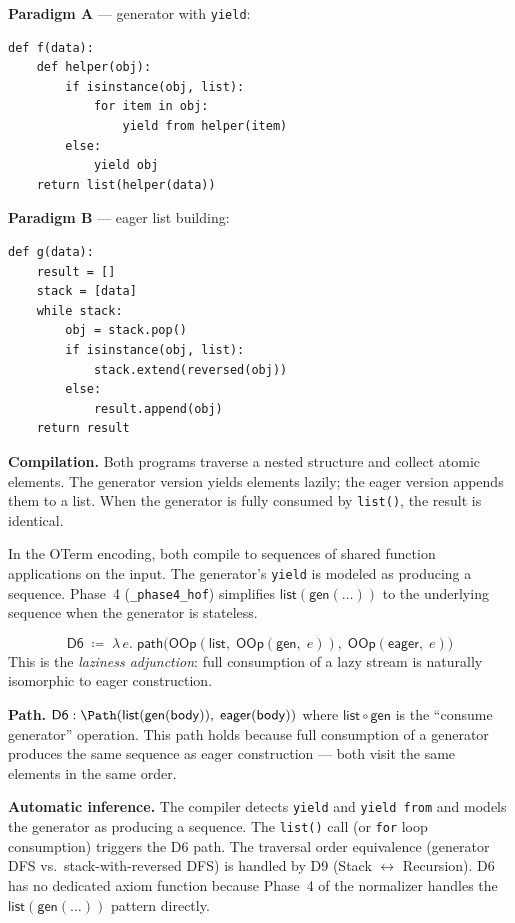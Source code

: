\textbf{Paradigm A} --- generator with \texttt{yield}:
\begin{lstlisting}
def f(data):
    def helper(obj):
        if isinstance(obj, list):
            for item in obj:
                yield from helper(item)
        else:
            yield obj
    return list(helper(data))
\end{lstlisting}

\textbf{Paradigm B} --- eager list building:
\begin{lstlisting}
def g(data):
    result = []
    stack = [data]
    while stack:
        obj = stack.pop()
        if isinstance(obj, list):
            stack.extend(reversed(obj))
        else:
            result.append(obj)
    return result
\end{lstlisting}

\textbf{Compilation.}
Both programs traverse a nested structure and collect atomic elements.
The generator version yields elements lazily; the eager version
appends them to a list.  When the generator is fully consumed by
\texttt{list()}, the result is identical.

In the OTerm encoding, both compile to sequences of shared function
applications on the input.  The generator's \texttt{yield} is modeled
as producing a sequence.  Phase~4 (\texttt{\_phase4\_hof}) simplifies
$\mathsf{list}(\mathsf{gen}(\ldots))$ to the underlying sequence when
the generator is stateless.

\begin{definition}
\label{def:d6-path}
\[
  \mathsf{D6} \;\coloneqq\; \lambda\, e.\;
  \mathsf{path}\!\big(
    \mathsf{OOp}(\mathsf{list},\;
      \mathsf{OOp}(\mathsf{gen},\; e)),\;
    \mathsf{OOp}(\mathsf{eager},\; e)
  \big)
\]
This is the \emph{laziness adjunction}: full consumption of a lazy
stream is naturally isomorphic to eager construction.
\end{definition}

\textbf{Path.}
$\mathsf{D6} : \Path(\mathsf{list}(\mathsf{gen}(\mathsf{body})),\;
\mathsf{eager}(\mathsf{body}))$
where $\mathsf{list} \circ \mathsf{gen}$ is the ``consume generator''
operation.  This path holds because full consumption of a generator
produces the same sequence as eager construction --- both visit the
same elements in the same order.

\textbf{Automatic inference.}
The compiler detects \texttt{yield} and \texttt{yield from} and models
the generator as producing a sequence.  The \texttt{list()} call
(or \texttt{for} loop consumption) triggers the D6 path.  The
traversal order equivalence (generator DFS vs.\ stack-with-reversed
DFS) is handled by D9 (Stack $\leftrightarrow$ Recursion).  D6 has
no dedicated axiom function because Phase~4 of the normalizer handles
the $\mathsf{list}(\mathsf{gen}(\ldots))$ pattern directly.


